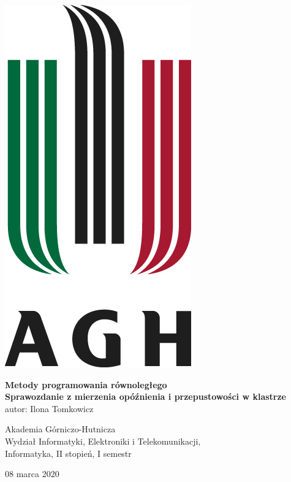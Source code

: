 \documentclass[10pt,english, openany]{book}
\begin{document}

\begin{titlepage}
	\clearpage\thispagestyle{empty}
	\centering
	\vspace{0.5cm}    
    \centering \includegraphics[scale=0.5]{agh.jpg}    
	\vspace{0.5cm}   
	
		\vspace{2cm}
	{\huge \textbf{Metody programowania równoległego}} \\
	\vspace{0.5cm} 
	{\Huge \textbf{Sprawozdanie z mierzenia opóźnienia i przepustowości w klastrze}} \\
	\vspace{6cm}	
	{\Large autor: Ilona Tomkowicz\\}
	\vspace{0.5cm} 
	{\Large Akademia Górniczo-Hutnicza\\
	Wydział Informatyki, Elektroniki i Telekomunikacji,\\
	Informatyka, II stopień, I semestr \par}
	   \vspace{0.5cm} 
	{\Large 08 marca 2020 \par}
	
	\pagebreak

\end{titlepage}
\end{document}
